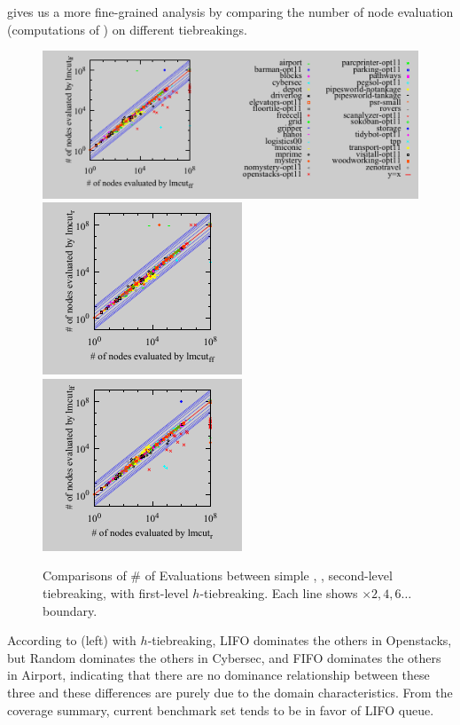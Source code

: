  gives us a more fine-grained analysis by comparing the
number of node evaluation (computations of \lmcut) on
different tiebreakings.

\begin{figure}[htbp]
 \centering {}
 \includegraphics{tables/aaai16-5min/aaai16prelim3/evaluated-lmcut_ff-lmcut_lf.pdf}
 \includegraphics{tables/aaai16-5min/aaai16prelim3/evaluated-nokey-lmcut_ff-lmcut_r.pdf}
 \includegraphics{tables/aaai16-5min/aaai16prelim3/evaluated-nokey-lmcut_r-lmcut_lf.pdf}
 \caption{Comparisons of \# of Evaluations between simple \lifo, \fifo,
 \ro second-level tiebreaking, with first-level $h$-tiebreaking. Each
 line shows $\times 2,4,6\ldots$ boundary.}  \label{f-h-eval}
\end{figure}

According to  (left) with $h$-tiebreaking, LIFO
dominates the others in Openstacks, but Random dominates the others in
Cybersec, and FIFO dominates the others in Airport, indicating that
there are no dominance relationship between these three and these
differences are purely due to the domain characteristics. From the
coverage summary, current benchmark set tends to be in favor of LIFO queue.

